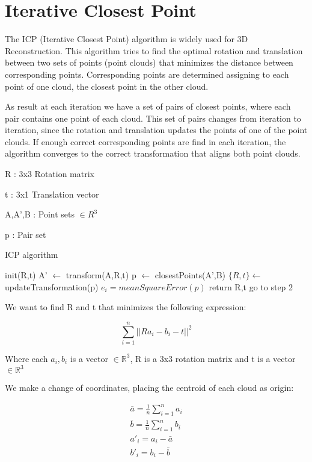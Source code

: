 
\section{Iterative Closest Point}

The ICP (Iterative Closest Point) algorithm \cite{mckay92} is widely used for 3D Reconstruction. This algorithm tries to find 
the optimal rotation and translation between two sets of points (point clouds) that minimizes the distance between corresponding 
points. Corresponding points are determined assigning to each point of one cloud, the closest point in the other cloud.

As result at each iteration we have a set of pairs of closest points, where each pair contains one point of each cloud. This set 
of pairs changes from iteration to iteration, since the rotation and translation updates the points of one of the point clouds. If enough correct 
corresponding points are find in each iteration, the algorithm converges to the correct transformation that aligns both point clouds.


R : 3x3 Rotation matrix

t : 3x1 Translation vector

A,A',B : Point sets $\in R^3$

p : Pair set

\begin{algorithm}
\caption{ICP algorithm}
\begin{algorithmic}[1]
\State init(R,t)
\State A' $\leftarrow$ transform(A,R,t) 
\State p $\leftarrow$ closestPoints(A',B)
\State $\{R,t\} \gets$ updateTransformation(p)
\State $e_i = meanSquareError(p)$
	\State return R,t
\Else
	\State go to step 2
\EndIf
\end{algorithmic}
\end{algorithm}


We want to find R and t that minimizes the following expression:

$$ \sum\limits_{i=1}^n ||R a_i -  b_i - t ||^2 $$

Where each $a_i,b_i$ is a vector $\in \mathbb{R}^3$, R is a 3x3 rotation matrix and t is a vector $\in \mathbb{R}^3$


We make a change of coordinates, placing the centroid of each cloud as origin:



\begin{align*}
 \bar{a} = \frac{1}{n} \sum\limits_{i=1}^n {a_i} \\ 
  \bar{b} = \frac{1}{n} \sum\limits_{i=1}^n {b_i} \\  
   {a'}_i = a_i - \bar{a}\\
   {b'}_i = b_i - \bar{b} 
\end{align*}

